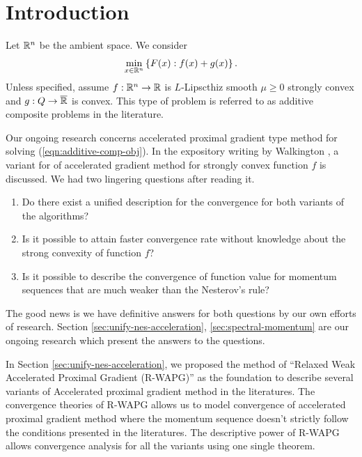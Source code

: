 \documentclass[12pt]{article}
\begin{document}
\section{Introduction}
    Let $\mathbb R^n$ be the ambient space. We consider 
    \begin{align}
        \min_{x \in \mathbb R^n} \left\lbrace
            F(x): f(x) + g(x)
        \right\rbrace.
    \end{align}\label{eqn:additive-comp-obj}
    Unless specified, assume $f:\mathbb R^n \rightarrow \mathbb R$ is $L$-Lipscthiz smooth $\mu \ge 0$ strongly convex and $g:Q \rightarrow \overline {\mathbb R}$ is convex. 
    This type of problem is referred to as additive composite problems in the literature. 
    \par
    Our ongoing research concerns accelerated proximal gradient type method for solving (\ref{eqn:additive-comp-obj}). 
    In the expository writing by Walkington \cite{noel_nesterovs_nodate}, a variant for of accelerated gradient method for strongly convex function $f$ is discussed. 
    We had two lingering questions after reading it. 
    \begin{enumerate}
        \item Do there exist a unified description for the convergence for both variants of the algorithms?
        \item Is it possible to attain faster convergence rate without knowledge about the strong convexity of function $f$?
        \item Is it possible to describe the convergence of function value for momentum sequences that are much weaker than the Nesterov's rule? 
    \end{enumerate}
    The good news is we have definitive answers for both questions by our own efforts of research. 
    Section \ref{sec:unify-nes-acceleration}, \ref{sec:spectral-momentum} are our ongoing research which present the answers to the questions. 
    \par
    In Section \ref{sec:unify-nes-acceleration}, we proposed the method of ``Relaxed Weak Accelerated Proximal Gradient (R-WAPG)'' as the foundation to describe several variants of Accelerated proximal gradient method in the literatures. 
    The convergence theories of R-WAPG allows us to model convergence of accelerated proximal gradient method where the momentum sequence doesn't strictly follow the conditions presented in the literatures. 
    The descriptive power of R-WAPG allows convergence analysis for all the variants using one single theorem. 
    \par
\end{document}
